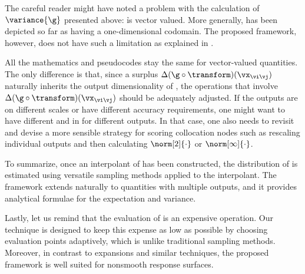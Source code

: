 The careful reader might have noted a problem with the calculation of
$\variance{\g}$ presented above: \h is vector valued. More generally, \g has
been depicted so far as having a one-dimensional codomain. The proposed
framework, however, does not have such a limitation as explained in
.

\begin{remark} 
All the mathematics and pseudocodes stay the same for vector-valued quantities.
The only difference is that, since a surplus $\Delta(\g \circ
\transform)(\vx_{\vi \vj})$ naturally inherits the output dimensionality of \g,
the operations that involve $\Delta(\g \circ \transform)(\vx_{\vi \vj})$ should
be adequately adjusted. If the outputs are on different scales or have different
accuracy requirements, one might want to have different  and 
in  for different outputs. In that case, one also needs to
revisit  and devise a more sensible strategy for scoring
collocation nodes such as rescaling individual outputs and then calculating
$\norm[2]{\cdot}$ or $\norm[\infty]{\cdot}$.
\end{remark}

To summarize, once an interpolant of \g has been constructed, the distribution
of \g is estimated using versatile sampling methods applied to the interpolant.
The framework extends naturally to quantities with multiple outputs, and it
provides analytical formulae for the expectation and variance.

Lastly, let us remind that the evaluation of \g is an expensive operation. Our
technique is designed to keep this expense as low as possible by choosing
evaluation points adaptively, which is unlike traditional sampling methods.
Moreover, in contrast to  expansions and similar techniques, the proposed
framework is well suited for nonsmooth response surfaces.
